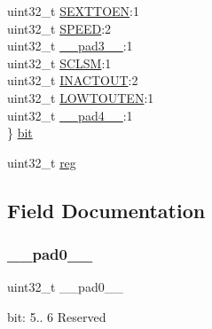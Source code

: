 \begin{DoxyCompactItemize}
\begin{tabbing}
\>uint32\_t \mbox{\hyperlink{union_s_e_r_c_o_m___i2_c_m___c_t_r_l_a___type_a7bb2c0fdd43b2e6cd251b9bc8171caff}{SEXTTOEN}}:1\\
\>uint32\_t \mbox{\hyperlink{union_s_e_r_c_o_m___i2_c_m___c_t_r_l_a___type_ac9b7e20ad3da84dff4e0cdd8bf58e4a3}{SPEED}}:2\\
\>uint32\_t \mbox{\hyperlink{union_s_e_r_c_o_m___i2_c_m___c_t_r_l_a___type_a4854608c0e776f0704a4d9a4b98ea57d}{\_\_pad3\_\_}}:1\\
\>uint32\_t \mbox{\hyperlink{union_s_e_r_c_o_m___i2_c_m___c_t_r_l_a___type_a3ac441d6088ab8d472aafd3081690747}{SCLSM}}:1\\
\>uint32\_t \mbox{\hyperlink{union_s_e_r_c_o_m___i2_c_m___c_t_r_l_a___type_aa0a4a65b54040a57355c195b30f9408a}{INACTOUT}}:2\\
\>uint32\_t \mbox{\hyperlink{union_s_e_r_c_o_m___i2_c_m___c_t_r_l_a___type_a11f66956297c8e71dfd6897ef7e9b5de}{LOWTOUTEN}}:1\\
\>uint32\_t \mbox{\hyperlink{union_s_e_r_c_o_m___i2_c_m___c_t_r_l_a___type_a7b2edc85d90e34c4435951e1e5c59517}{\_\_pad4\_\_}}:1\\
\} \mbox{\hyperlink{union_s_e_r_c_o_m___i2_c_m___c_t_r_l_a___type_ad7df6dd75ecb8692ab4fd73f5a1cf664}{bit}}\\

\end{tabbing}\item 
uint32\+\_\+t \mbox{\hyperlink{union_s_e_r_c_o_m___i2_c_m___c_t_r_l_a___type_a6b91636401516a477989a336376d7b40}{reg}}
\end{DoxyCompactItemize}


\subsection{Field Documentation}
\mbox{\label{union_s_e_r_c_o_m___i2_c_m___c_t_r_l_a___type_a3e57c2ef1c3ffb36722f000cc1156824}} 
\subsubsection{\texorpdfstring{\_\_pad0\_\_}{\_\_pad0\_\_}}
{\footnotesize\ttfamily uint32\+\_\+t \+\_\+\+\_\+pad0\+\_\+\+\_\+}

bit\+: 5.. 6 Reserved \mbox{\label{union_s_e_r_c_o_m___i2_c_m___c_t_r_l_a___type_a6712ba6dd1d5b43d2d56ff8ac4e275a7}} 
